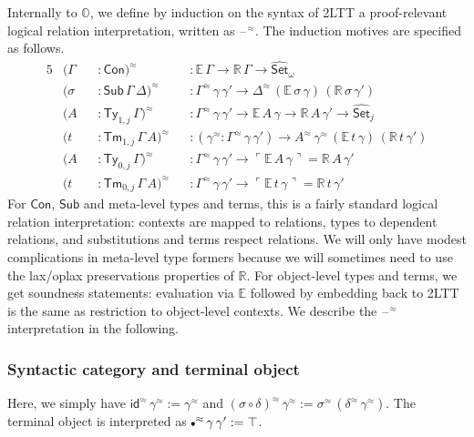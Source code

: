 \documentclass[acmsmall,review]{acmart}
\newcommand{\msf}[1]{\mathsf{#1}}
\newcommand{\mbb}[1]{\mathbb{#1}}
\newcommand{\wh}[1]{\widehat{#1}}
\newcommand{\mbbo}{\mbb{O}}
\newcommand{\Con}{\msf{Con}}
\newcommand{\Sub}{\msf{Sub}}
\newcommand{\Ty}{\msf{Ty}}
\newcommand{\Tm}{\msf{Tm}}
\newcommand{\emptycon}{\scaleobj{.75}\bullet}
\newcommand{\id}{\msf{id}}
\newcommand{\Set}{\mathsf{Set}}
\newcommand{\blank}{{\mathord{\hspace{1pt}\text{--}\hspace{1pt}}}}
\newcommand{\emb}[1]{\ulcorner#1\urcorner}
\newcommand{\hato}{\bm\hat{\mbbo}}
\newcommand{\ev}{\mbb{E}}
\newcommand{\re}{\mbb{R}}
\theoremstyle{remark}
\newcommand{\whset}{\wh{\Set}}
\newcommand{\rel}{^{\approx}}
\begin{document}
Internally to $\hato$, we define by induction on the syntax of 2LTT a
proof-relevant logical relation interpretation, written as $\blank^{\approx}$. The induction
motives are specified as follows.
\begin{alignat*}{5}
  &(\Gamma &&: \Con)\rel && : \ev\,\Gamma \to \re\,\Gamma \to \whset_\omega\\
  &(\sigma &&: \Sub\,\Gamma\,\Delta)\rel &&: \Gamma\rel\,\gamma\,\gamma' \to \Delta\rel\,(\ev\,\sigma\,\gamma)\,(\re\,\sigma\,\gamma')\\
  &(A      &&: \Ty_{1,j}\,\Gamma)\rel &&: \Gamma\rel\,\gamma\,\gamma' \to \ev\,A\,\gamma \to \re\,A\,\gamma' \to \whset_j\\
  &(t      &&: \Tm_{1,j}\,\Gamma\,A)\rel &&: (\gamma\rel : \Gamma\rel\,\gamma\,\gamma') \to A\rel\,\gamma\rel\,(\ev\,t\,\gamma)\,(\re\,t\,\gamma')\\
  &(A      &&: \Ty_{0,j}\,\Gamma)\rel &&: \Gamma\rel\,\gamma\,\gamma' \to \emb{\ev\,A\,\gamma} = \re\,A\,\gamma' \\
  &(t      &&: \Tm_{0,j}\,\Gamma\,A)\rel &&: \Gamma\rel\,\gamma\,\gamma' \to \emb{\ev\,t\,\gamma} = \re\,t\,\gamma'
\end{alignat*}
For $\Con$, $\Sub$ and meta-level types and terms, this is a fairly standard
logical relation interpretation: contexts are mapped to relations, types to
dependent relations, and substitutions and terms respect relations. We will only have
modest complications in meta-level type formers because we will sometimes need to use
the lax/oplax preservations properties of $\re$. For object-level types and
terms, we get soundness statements: evaluation via $\ev$ followed by embedding
back to 2LTT is the same as restriction to object-level contexts. We describe
the $\blank\rel$ interpretation in the following.

\subsubsection{Syntactic category and terminal object}
Here, we simply have $\id\rel\,\gamma\rel := \gamma\rel$ and $(\sigma \circ
\delta)\rel\,\gamma\rel := \sigma\rel\,(\delta\rel\,\gamma\rel)$. The terminal
object is interpreted as $\emptycon\rel\,\gamma\,\gamma' := \top$.
\end{document}
